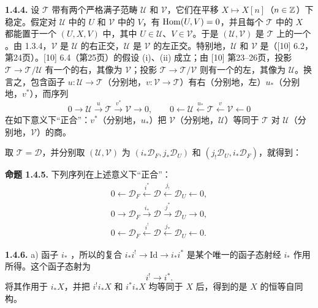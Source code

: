 \par\medskip\noindent\textbf{1.4.4.}
设 $\mathcal T$ 带有两个严格满子范畴 $\mathcal U$ 和 $\mathcal V$，它们在平移 $X\mapsto X[n]$（$n\in\mathbb Z$）下稳定。假定对 $\mathcal U$ 中的 $U$ 和 $\mathcal V$ 中的 $V$，有 $\operatorname{Hom}(U,V)=0$，并且每个 $\mathcal T$ 中的 $X$ 都能置于一个 $(U,X,V)$ 中，其中 $U\in\mathcal U$、$V\in\mathcal V$。于是 $(\mathcal U,\mathcal V)$ 是 $\mathcal T$ 上的一个 。由 1.3.4，$\mathcal V$ 是 $\mathcal U$ 的右正交，$\mathcal U$ 是 $\mathcal V$ 的左正交。特别地，$\mathcal U$ 和 $\mathcal V$ 是（[10] 6.2，第24页）。[10] 6.4（第25页）的假设 (i)、(ii) 成立；由 [10] 第23--26页，投影 $\mathcal T\to\mathcal T/\mathcal U$ 有一个的右，其像为 $\mathcal V$；投影 $\mathcal T\to\mathcal T/\mathcal V$ 则有一个的左，其像为 $\mathcal U$。换言之，包含函子 $u:\mathcal U\to\mathcal T$（分别地，$v:\mathcal V\to\mathcal T$）有右（分别地，左）$u_*$（分别地，$v^*$），而序列
\[
0\longrightarrow\mathcal U\xrightarrow{u}\mathcal T\xrightarrow{v^*}\mathcal V\longrightarrow0,
\qquad
0\longleftarrow\mathcal U\xleftarrow{u_*}\mathcal T\xleftarrow{v}\mathcal V\longleftarrow0
\]
在如下意义下“正合”：$v^*$（分别地，$u_*$）把 $\mathcal V$（分别地，$\mathcal U$）等同于 $\mathcal T$ 对 $\mathcal U$（分别地，$\mathcal V$）的商。

取 $\mathcal T=\mathcal D$，并分别取 $(\mathcal U,\mathcal V)$ 为 $(i_*\mathcal D_F,j_*\mathcal D_U)$ 和 $(j_!\mathcal D_U,i_*\mathcal D_F)$，就得到：

\par\medskip\noindent\textbf{命题 1.4.5.} 下列序列在上述意义下“正合”：
\[
\begin{gathered}
0\longleftarrow\mathcal D_F\xleftarrow{i^*}\mathcal D\xleftarrow{j_!}\mathcal D_U\longleftarrow0,\\
0\longrightarrow\mathcal D_F\xrightarrow{i_*}\mathcal D\xrightarrow{j^*}\mathcal D_U\longrightarrow0,\\
0\longleftarrow\mathcal D_F\xleftarrow{i^!}\mathcal D\xleftarrow{j_*}\mathcal D_U\longleftarrow0.
\end{gathered}
\]

\par\medskip\noindent\textbf{1.4.6.}
a) 函子 $i_*$ ，所以的复合 $i_*i^!\to\mathrm{Id}\to i_*i^*$ 是某个唯一的函子态射经 $i_*$ 作用所得。这个函子态射为
\begin{equation*}
i^!\longrightarrow i^*.\tag{1.4.6.1}
\end{equation*}
将其作用于 $i_*X$，并把 $i^!i_*X$ 和 $i^*i_*X$ 均等同于 $X$ 后，得到的是 $X$ 的恒等自同构。

